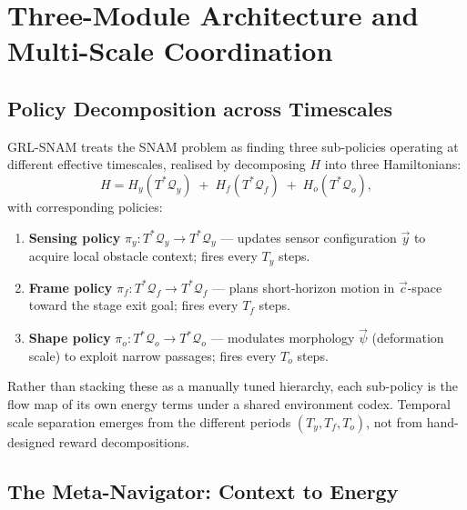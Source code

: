 \section{Three-Module Architecture and Multi-Scale Coordination}
\label{sec:ch3:architecture}

\subsection{Policy Decomposition across Timescales}
\label{subsec:ch3:decomp}

GRL-SNAM treats the SNAM problem as finding three sub-policies operating
at different effective timescales, realised by decomposing $H$ into three
Hamiltonians:
\begin{equation}
  H = H_y(T^*\mathcal{Q}_y) \;+\; H_f(T^*\mathcal{Q}_f)
      \;+\; H_o(T^*\mathcal{Q}_o),
  \label{eq:ch3:ham_decomp}
\end{equation}
with corresponding policies:
\begin{enumerate}
  \item \textbf{Sensing policy} $\pi_y : T^*\mathcal{Q}_y \to T^*\mathcal{Q}_y$
        — updates sensor configuration $\vec{y}$ to acquire local obstacle
        context; fires every $T_y$ steps.
  \item \textbf{Frame policy} $\pi_f : T^*\mathcal{Q}_f \to T^*\mathcal{Q}_f$
        — plans short-horizon motion in $\vec{c}$-space toward the stage
        exit goal; fires every $T_f$ steps.
  \item \textbf{Shape policy} $\pi_o : T^*\mathcal{Q}_o \to T^*\mathcal{Q}_o$
        — modulates morphology $\vec{\psi}$ (deformation scale) to exploit
        narrow passages; fires every $T_o$ steps.
\end{enumerate}
Rather than stacking these as a manually tuned hierarchy, each sub-policy
is the flow map of its own energy terms under a shared environment
codex.
Temporal scale separation emerges from the different periods
$(T_y, T_f, T_o)$, not from hand-designed reward decompositions.

\subsection{The Meta-Navigator: Context to Energy}
\label{subsec:ch3:metanav}

